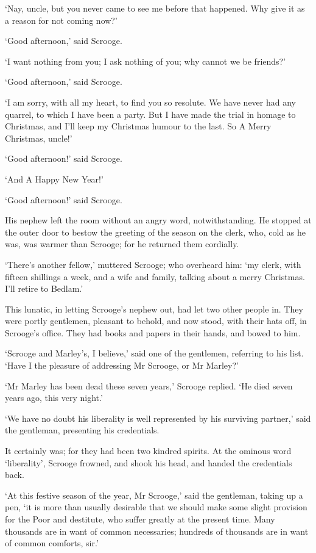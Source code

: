 \documentclass[11pt,twoside]{article}\makeatletter
\begin{document}
‘Nay, uncle, but you never came to see me before that happened. Why give it as a reason for not coming now?’\par
‘Good afternoon,’ said Scrooge.\par
‘I want nothing from you; I ask nothing of you; why cannot we be friends?’\par
‘Good afternoon,’ said Scrooge.\par
‘I am sorry, with all my heart, to find you so resolute. We have never had any quarrel, to which I have been a party. But I have made the trial in homage to Christmas, and I'll keep my Christmas humour to the last. So A Merry Christmas, uncle!’\par
‘Good afternoon!’ said Scrooge.\par
‘And A Happy New Year!’\par
‘Good afternoon!’ said Scrooge.\par
His nephew left the room without an angry word, notwithstanding. He stopped at the outer door to bestow the greeting of the season on the clerk, who, cold as he was, was warmer than Scrooge; for he returned them cordially. \par
‘There's another fellow,’ muttered Scrooge; who overheard him: ‘my clerk, with fifteen shillings a week, and a wife and family, talking about a merry Christmas. I'll retire to Bedlam.’\par
This lunatic, in letting Scrooge's nephew out, had let two other people in. They were portly gentlemen, pleasant to behold, and now stood, with their hats off, in Scrooge's office. They had books and papers in their hands, and bowed to him. \par
‘Scrooge and Marley's, I believe,’ said one of the gentlemen, referring to his list. ‘Have I the pleasure of addressing Mr Scrooge, or Mr Marley?’\par
‘Mr Marley has been dead these seven years,’ Scrooge replied. ‘He died seven years ago, this very night.’\par
‘We have no doubt his liberality is well represented by his surviving partner,’ said the gentleman, presenting his credentials.\par
It certainly was; for they had been two kindred spirits. At the ominous word ‘liberality’, Scrooge frowned, and shook his head, and handed the credentials back.\par
‘At this festive season of the year, Mr Scrooge,’ said the gentleman, taking up a pen, ‘it is more than usually desirable that we should make some slight provision for the Poor and destitute, who suffer greatly at the present time. Many thousands are in want of common necessaries; hundreds of thousands are in want of common comforts, sir.’\par
\end{document}
